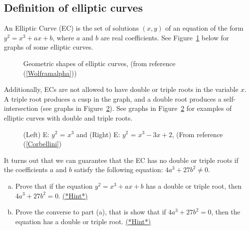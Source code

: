 \subsection{Definition of elliptic curves}
An Elliptic Curve (EC) is the set of solutions $(x,y)$ of  an equation of the form $y^2 = x^3 + ax + b$, where $a$ and $b$ are real coefficients.  See Figure~\ref{fig:DH:DHKE_5} below for graphs of some elliptic  curves.  
\begin{figure}[htbp]
	  \caption{\label{fig:DH:DHKE_5}  Geometric shapes of elliptic curves, (from reference (\ref{Wolframalpha}))}
\end{figure}
Additionally, ECs are not allowed to have double or triple roots in the variable $x$.  A triple root produces a cusp in the graph, and a double root produces a self-intersection (see graphs in Figure~\ref{fig:DH:DHKE_10}). See graphs in Figure~\ref{fig:DH:DHKE_10} for examples of elliptic curves with double and triple roots.
\begin{figure}[htbp]
	  \caption{\label{fig:DH:DHKE_10}(Left) E: $ y^2$ = $x^3$ and (Right) E: $ y^2$ = $x^3-3x+2$, (From reference (\ref{Corbellini})}
\end{figure}
 It turns out that we can guarantee that the EC has no double or triple roots if the coefficients $a$ and $b$ satisfy the following equation: $4a^3 + 27b^2 \neq 0$. 

\begin{exercise}\label{exercise:further_crypt:dubroots}
		\begin{enumerate}[(a)] 
	\item  Prove that if the equation $y^2 = x^3 + ax + b$ has a double or triple root, then $4a^3+27b^2=0$. 
\hyperref[sec:further_crypt:hints]{(*Hint*)}
	\item Prove the converse to part (a), that is show that if $4a^3 + 27b ^2=0$, then the equation has a double or triple root. \hyperref[sec:further_crypt:hints]{(*Hint*)}
\end{enumerate} 
\end{exercise}

